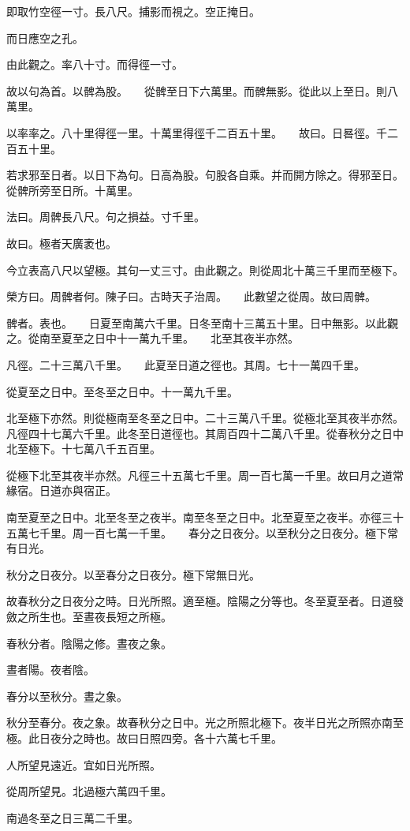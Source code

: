 \documentclass[a4paper,12pt,UTF8,twoside]{ctexbook}
\begin{document}
即取竹空徑一寸。長八尺。捕影而視之。空正掩日。

而日應空之孔。

由此觀之。率八十寸。而得徑一寸。

故以句為首。以髀為股。　　從髀至日下六萬里。而髀無影。從此以上至日。則八萬里。

以率率之。八十里得徑一里。十萬里得徑千二百五十里。　　故曰。日晷徑。千二百五十里。

若求邪至日者。以日下為句。日高為股。句股各自乘。并而開方除之。得邪至日。從髀所旁至日所。十萬里。

法曰。周髀長八尺。句之損益。寸千里。

故曰。極者天廣袤也。

今立表高八尺以望極。其句一丈三寸。由此觀之。則從周北十萬三千里而至極下。

榮方曰。周髀者何。陳子曰。古時天子治周。　　此數望之從周。故曰周髀。

髀者。表也。　　日夏至南萬六千里。日冬至南十三萬五十里。日中無影。以此觀之。從南至夏至之日中十一萬九千里。　　北至其夜半亦然。

凡徑。二十三萬八千里。　　此夏至日道之徑也。其周。七十一萬四千里。

從夏至之日中。至冬至之日中。十一萬九千里。

北至極下亦然。則從極南至冬至之日中。二十三萬八千里。從極北至其夜半亦然。凡徑四十七萬六千里。此冬至日道徑也。其周百四十二萬八千里。從春秋分之日中北至極下。十七萬八千五百里。

從極下北至其夜半亦然。凡徑三十五萬七千里。周一百七萬一千里。故曰月之道常緣宿。日道亦與宿正。

南至夏至之日中。北至冬至之夜半。南至冬至之日中。北至夏至之夜半。亦徑三十五萬七千里。周一百七萬一千里。　　春分之日夜分。以至秋分之日夜分。極下常有日光。

秋分之日夜分。以至春分之日夜分。極下常無日光。

故春秋分之日夜分之時。日光所照。適至極。陰陽之分等也。冬至夏至者。日道發斂之所生也。至晝夜長短之所極。

春秋分者。陰陽之修。晝夜之象。

晝者陽。夜者陰。

春分以至秋分。晝之象。

秋分至春分。夜之象。故春秋分之日中。光之所照北極下。夜半日光之所照亦南至極。此日夜分之時也。故曰日照四旁。各十六萬七千里。

人所望見遠近。宜如日光所照。

從周所望見。北過極六萬四千里。

南過冬至之日三萬二千里。
\end{document}
